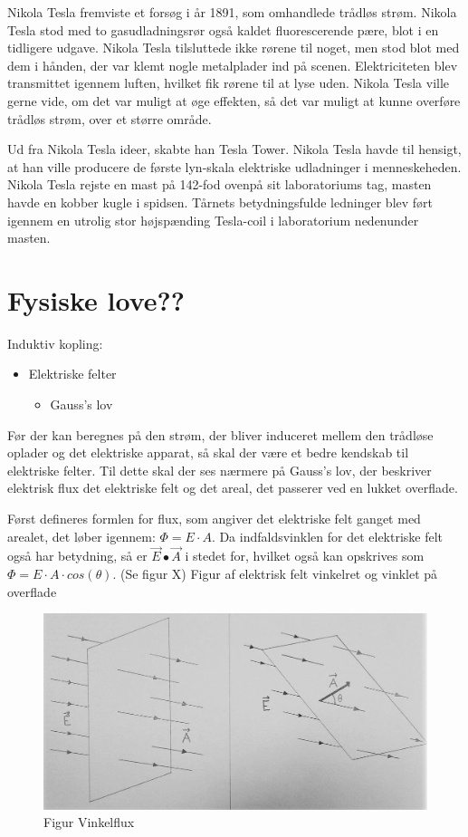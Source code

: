 Nikola Tesla fremviste et forsøg i år 1891, som omhandlede trådløs strøm. Nikola Tesla stod med to gasudladningsrør også kaldet fluorescerende pære, blot i en tidligere udgave. Nikola Tesla tilsluttede ikke rørene til noget, men stod blot med dem i hånden, der var klemt nogle metalplader ind på scenen. Elektriciteten blev transmittet igennem luften, hvilket fik rørene til at lyse uden. Nikola Tesla ville gerne vide, om det var muligt at øge effekten, så det var muligt at kunne overføre trådløs strøm, over et større område.

Ud fra Nikola Tesla ideer, skabte han Tesla Tower. Nikola Tesla havde til hensigt, at han ville producere de første lyn-skala elektriske udladninger i menneskeheden. Nikola Tesla rejste en mast på 142-fod ovenpå sit laboratoriums tag, masten havde en kobber kugle i spidsen. Tårnets betydningsfulde ledninger blev ført igennem en utrolig stor højspænding Tesla-coil i laboratorium nedenunder masten. 

\newpage

\section{Fysiske love??}
Induktiv kopling:
\begin{itemize}
\item Elektriske felter
\begin{itemize}
\item Gauss's lov
\end{itemize}
\end{itemize}

Før der kan beregnes på den strøm, der bliver induceret mellem den trådløse oplader og det elektriske apparat, så skal der være et bedre kendskab til elektriske felter. Til dette skal der ses nærmere på Gauss's lov, der beskriver elektrisk flux det elektriske felt og det areal, det passerer ved en lukket overflade.

Først defineres formlen for flux, som angiver det elektriske felt ganget med arealet, det løber igennem: $\Phi = E \cdot A$. Da indfaldsvinklen for det elektriske felt også har betydning, så er $\vec{E} \bullet \vec{A}$ i stedet for, hvilket også kan opskrives som $\Phi = E \cdot A \cdot cos(\theta)$. (Se figur X) Figur af elektrisk felt vinkelret og vinklet på overflade

\begin{figure}[H]
\centering
\includegraphics[scale=0.5]{Vildledning/Schematics/vinkelflux.jpg}
\caption{Figur Vinkelflux}
\end{figure}

